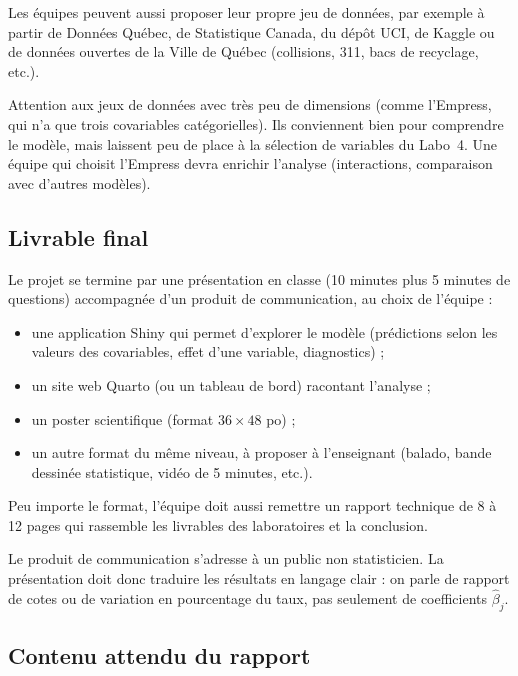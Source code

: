 \documentclass[11pt,letterpaper]{scrartcl}
\begin{document}
Les équipes peuvent aussi proposer leur propre jeu de données, par exemple à partir de Données Québec, de Statistique Canada, du dépôt UCI, de Kaggle ou de données ouvertes de la Ville de Québec (collisions, 311, bacs de recyclage, etc.).

\begin{envremarque}
Attention aux jeux de données avec très peu de dimensions (comme l'Empress, qui n'a que trois covariables catégorielles). Ils conviennent bien pour comprendre le modèle, mais laissent peu de place à la sélection de variables du Labo~4. Une équipe qui choisit l'Empress devra enrichir l'analyse (interactions, comparaison avec d'autres modèles).
\end{envremarque}

\subsection{Livrable final}

Le projet se termine par une présentation en classe (10 minutes plus 5 minutes de questions) accompagnée d'un produit de communication, au choix de l'équipe :
\begin{itemize}
  \item une application Shiny qui permet d'explorer le modèle (prédictions selon les valeurs des covariables, effet d'une variable, diagnostics) ;
  \item un site web Quarto (ou un tableau de bord) racontant l'analyse ;
  \item un poster scientifique (format $36 \times 48$ po) ;
  \item un autre format du même niveau, à proposer à l'enseignant (balado, bande dessinée statistique, vidéo de 5 minutes, etc.).
\end{itemize}

Peu importe le format, l'équipe doit aussi remettre un rapport technique de 8 à 12 pages qui rassemble les livrables des laboratoires et la conclusion.

Le produit de communication s'adresse à un public non statisticien. La présentation doit donc traduire les résultats en langage clair : on parle de rapport de cotes ou de variation en pourcentage du taux, pas seulement de coefficients $\hat\beta_j$.

\subsection{Contenu attendu du rapport}
\end{document}
